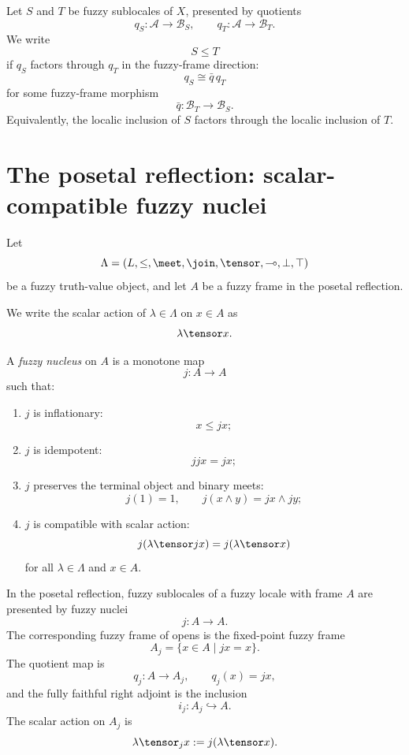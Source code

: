\begin{definition}
\label{def:fuzzy-sublocale-order}
Let \(S\) and \(T\) be fuzzy sublocales of \(X\), presented by quotients
\[
    q_S:\mathcal A\to\mathcal B_S,
    \qquad
    q_T:\mathcal A\to\mathcal B_T.
\]
We write
\[
    S\leq T
\]
if \(q_S\) factors through \(q_T\) in the fuzzy-frame direction:
\[
    q_S\cong \bar q\, q_T
\]
for some fuzzy-frame morphism
\[
    \bar q:\mathcal B_T\to\mathcal B_S.
\]
Equivalently, the localic inclusion of \(S\) factors through the localic
inclusion of \(T\).
\end{definition}

\section{The posetal reflection: scalar-compatible fuzzy nuclei}
\label{sec:posetal-reflection-scalar-compatible-nuclei}

Let
\[
    \Lambda=(L,\leq,\meet,\join,\tensor,\multimap,\bot,\top)
\]
be a fuzzy truth-value object, and let \(A\) be a fuzzy frame in the posetal
reflection.

We write the scalar action of \(\lambda\in\Lambda\) on \(x\in A\) as
\[
    \lambda\tensor x.
\]

\begin{definition}
\label{def:fuzzy-nucleus}
A \emph{fuzzy nucleus} on \(A\) is a monotone map
\[
    j:A\to A
\]
such that:

\begin{enumerate}
    \item \(j\) is inflationary:
    \[
        x\leq jx;
    \]

    \item \(j\) is idempotent:
    \[
        jjx=jx;
    \]

    \item \(j\) preserves the terminal object and binary meets:
    \[
        j(1)=1,
        \qquad
        j(x\wedge y)=jx\wedge jy;
    \]

    \item \(j\) is compatible with scalar action:
    \[
        j(\lambda\tensor jx)
        =
        j(\lambda\tensor x)
    \]
    for all \(\lambda\in\Lambda\) and \(x\in A\).
\end{enumerate}
\end{definition}

\begin{proposition}
\label{prop:fuzzy-nuclei-reflective-quotients}
In the posetal reflection, fuzzy sublocales of a fuzzy locale with frame \(A\)
are presented by fuzzy nuclei
\[
    j:A\to A.
\]
The corresponding fuzzy frame of opens is the fixed-point fuzzy frame
\[
    A_j=\{x\in A\mid jx=x\}.
\]
The quotient map is
\[
    q_j:A\to A_j,
    \qquad
    q_j(x)=jx,
\]
and the fully faithful right adjoint is the inclusion
\[
    i_j:A_j\hookrightarrow A.
\]
The scalar action on \(A_j\) is
\[
    \lambda\tensor_j x
    :=
    j(\lambda\tensor x).
\]
\end{proposition}

